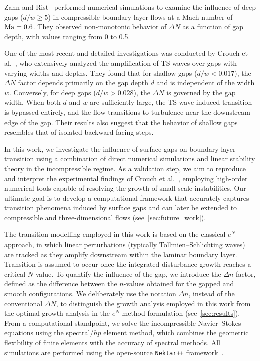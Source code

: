 \documentclass[../main.tex]{subfiles}
\begin{document}
Zahn and Rist~\cite{zahnRist} performed numerical simulations to examine the influence of deep gaps ($d/w \geq 5$) in compressible boundary-layer flows at a Mach number of $\text{Ma} = 0.6$. They observed non-monotonic behavior of $\Delta N$ as a function of gap depth, with values ranging from 0 to 0.5.

One of the most recent and detailed investigations was conducted by Crouch et al.~\cite{jeffGaps}, who extensively analyzed the amplification of TS waves over gaps with varying widths and depths. They found that for shallow gaps ($d/w < 0.017$), the $\Delta N$ factor depends primarily on the gap depth $d$ and is independent of the width $w$. Conversely, for deep gaps ($d/w > 0.028$), the $\Delta N$ is governed by the gap width. When both $d$ and $w$ are sufficiently large, the TS-wave-induced transition is bypassed entirely, and the flow transitions to turbulence near the downstream edge of the gap. Their results also suggest that the behavior of shallow gaps resembles that of isolated backward-facing steps.

In this work, we investigate the influence of surface gaps on boundary-layer transition using a combination of direct numerical simulations and linear stability theory in the incompressible regime. As a validation step, we aim to reproduce and interpret the experimental findings of Crouch et al.~\cite{jeffGaps}, employing high-order numerical tools capable of resolving the growth of small-scale instabilities. Our ultimate goal is to develop a computational framework that accurately captures transition phenomena induced by surface gaps and can later be extended to compressible and three-dimensional flows (see~\cref{sec:future_work}).

The transition modelling employed in this work is based on the classical $e^N$ approach, in which linear perturbations (typically Tollmien--Schlichting waves) are tracked as they amplify downstream within the laminar boundary layer. Transition is assumed to occur once the integrated disturbance growth reaches a critical $N$ value. To quantify the influence of the gap, we introduce the $\Delta n$ factor, defined as the difference between the $n$-values obtained for the gapped and smooth configurations. We deliberately use the notation $\Delta n$, instead of the conventional $\Delta N$, to distinguish the growth analysis employed in this work from the optimal growth analysis in the $e^N$-method formulation (see~\cref{sec:results}). From a computational standpoint, we solve the incompressible Navier--Stokes equations using the spectral/$hp$ element method, which combines the geometric flexibility of finite elements with the accuracy of spectral methods. All simulations are performed using the open-source \texttt{Nektar++} framework~\cite{nektar}.
\end{document}
